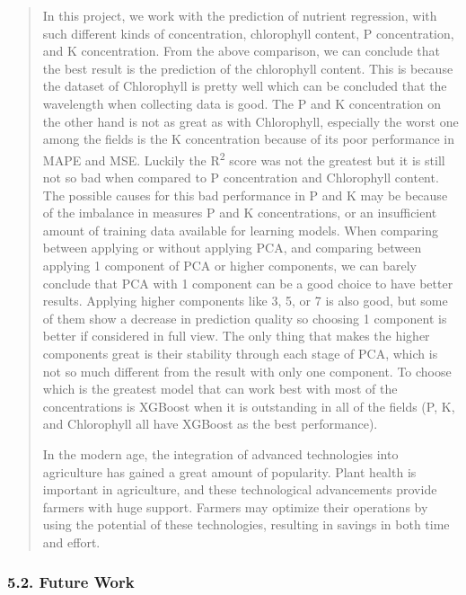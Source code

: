 \documentclass[
]{article}
\begin{document}
\begin{quote}
In this project, we work with the prediction of nutrient regression,
with such different kinds of concentration, chlorophyll content, P
concentration, and K concentration. From the above comparison, we can
conclude that the best result is the prediction of the chlorophyll
content. This is because the dataset of Chlorophyll is pretty well which
can be concluded that the wavelength when collecting data is good. The P
and K concentration on the other hand is not as great as with
Chlorophyll, especially the worst one among the fields is the K
concentration because of its poor performance in MAPE and MSE. Luckily
the R\textsuperscript{2} score was not the greatest but it is still not
so bad when compared to P concentration and Chlorophyll content. The
possible causes for this bad performance in P and K may be because of
the imbalance in measures P and K concentrations, or an insufficient
amount of training data available for learning models. When comparing
between applying or without applying PCA, and comparing between applying
1 component of PCA or higher components, we can barely conclude that PCA
with 1 component can be a good choice to have better results. Applying
higher components like 3, 5, or 7 is also good, but some of them show a
decrease in prediction quality so choosing 1 component is better if
considered in full view. The only thing that makes the higher components
great is their stability through each stage of PCA, which is not so much
different from the result with only one component. To choose which is
the greatest model that can work best with most of the concentrations is
XGBoost when it is outstanding in all of the fields (P, K, and
Chlorophyll all have XGBoost as the best performance).

In the modern age, the integration of advanced technologies into
agriculture has gained a great amount of popularity. Plant health is
important in agriculture, and these technological advancements provide
farmers with huge support. Farmers may optimize their operations by
using the potential of these technologies, resulting in savings in both
time and effort.
\end{quote}

\hypertarget{future-work}{%
\subsubsection{\texorpdfstring{\textbf{5.2. Future
Work}}{5.2. Future Work}}\label{future-work}}
\end{document}

